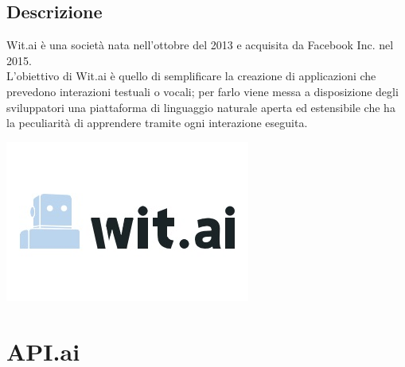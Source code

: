 \documentclass[a4paper,titlepage]{article}
\begin{document}
	\subsection{Descrizione}
		\begin{minipage}{0.7\textwidth}\raggedright
			Wit.ai è una società nata nell'ottobre del 2013 e acquisita da Facebook Inc. nel 2015. \\
			L'obiettivo di Wit.ai è quello di semplificare la creazione di applicazioni che prevedono interazioni testuali o vocali; per farlo viene messa a disposizione degli sviluppatori una piattaforma di linguaggio naturale aperta ed estensibile che ha la peculiarità di apprendere tramite ogni interazione eseguita.
		\end{minipage}
		\hfill
		\noindent\begin{minipage}{0.15\textwidth}
		\includegraphics[scale=0.6]{images/witai.jpg}
		\end{minipage}

\section{API.ai}
\end{document}
